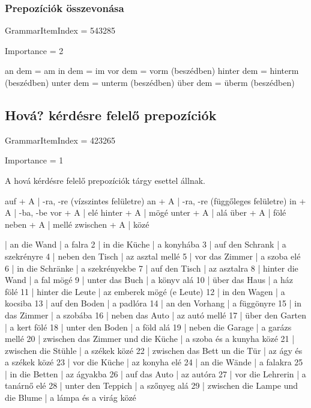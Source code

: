 \documentclass{article}
\newenvironment{desc}{\verbatim}{\endverbatim}
\newenvironment{exmp}{\verbatim}{\endverbatim}
\begin{document}
\subsubsection{Prepozíciók összevonása}

GrammarItemIndex = 543285

Importance = 2

\begin{desc}
an dem = am
in dem = im
vor dem = vorm (beszédben)
hinter dem = hinterm (beszédben)
unter dem = unterm (beszédben)
über dem = überm (beszédben)
\end{desc}

\subsection{Hová? kérdésre felelő prepozíciók}

GrammarItemIndex = 423265

Importance = 1

\begin{desc}
A hová kérdésre felelő prepozíciók tárgy esettel állnak.

auf + A      | -ra, -re (vízszintes felületre)
an + A       | -ra, -re (függőleges felületre)
in + A       | -ba, -be
vor + A      | elé
hinter + A   | mögé
unter + A    | alá
über + A     | fölé
neben + A    | mellé
zwischen + A | közé
\end{desc}

\begin{exmp}
1 | an die Wand | a falra
2 | in die Küche | a konyhába
3 | auf den Schrank | a szekrényre
4 | neben den Tisch | az asztal mellé
5 | vor das Zimmer | a szoba elé
6 | in die Schränke | a szekrényekbe
7 | auf den Tisch | az asztalra
8 | hinter die Wand | a fal mögé
9 | unter das Buch | a könyv alá
10 | über das Haus | a ház fölé
11 | hinter die Leute | az emberek mögé (e Leute)
12 | in den Wagen | a kocsiba
13 | auf den Boden | a padlóra
14 | an den Vorhang | a függönyre
15 | in das Zimmer | a szobába
16 | neben das Auto | az autó mellé
17 | über den Garten | a kert fölé
18 | unter den Boden | a föld alá
19 | neben die Garage | a garázs mellé
20 | zwischen das Zimmer und die Küche | a szoba és a kunyha közé
21 | zwischen die Stühle | a székek közé
22 | zwischen das Bett un die Tür | az ágy és a székek közé
23 | vor die Küche | az konyha elé
24 | an die Wände | a falakra
25 | in die Betten | az ágyakba
26 | auf das Auto | az autóra
27 | vor die Lehrerin | a tanárnő elé
28 | unter den Teppich | a szőnyeg alá
29 | zwischen die Lampe und die Blume | a lámpa és a virág közé
\end{exmp}
\end{document}
